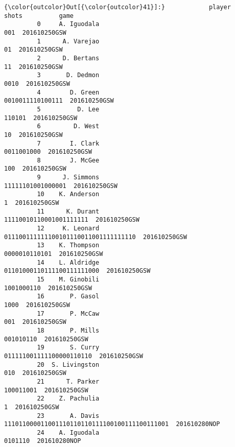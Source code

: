 \documentclass[11pt]{article}
\begin{document}
\begin{Verbatim}[commandchars=\\\{\}]
{\color{outcolor}Out[{\color{outcolor}41}]:}            player                                          shots          game
         0     A. Iguodala                                            001  201610250GSW
         1      A. Varejao                                             01  201610250GSW
         2      D. Bertans                                             11  201610250GSW
         3       D. Dedmon                                           0010  201610250GSW
         4        D. Green                               0010011110100111  201610250GSW
         5          D. Lee                                         110101  201610250GSW
         6         D. West                                             10  201610250GSW
         7        I. Clark                                     0011001000  201610250GSW
         8        J. McGee                                            100  201610250GSW
         9      J. Simmons                              11111101001000001  201610250GSW
         10    K. Anderson                                              1  201610250GSW
         11      K. Durant                        11110010110001001111111  201610250GSW
         12     K. Leonard           011100111111100101110011001111111110  201610250GSW
         13    K. Thompson                                  0000010110101  201610250GSW
         14    L. Aldridge                     01101000110111100111111000  201610250GSW
         15    M. Ginobili                                     1001000110  201610250GSW
         16       P. Gasol                                           1000  201610250GSW
         17       P. McCaw                                            001  201610250GSW
         18       P. Mills                                      001010110  201610250GSW
         19       S. Curry                       011111001111100000110110  201610250GSW
         20  S. Livingston                                            010  201610250GSW
         21      T. Parker                                      100011001  201610250GSW
         22    Z. Pachulia                                              1  201610250GSW
         23       A. Davis  111011000011001110110110111100100111100111001  201610280NOP
         24    A. Iguodala                                        0101110  201610280NOP
\end{Verbatim}
            
\end{document}
